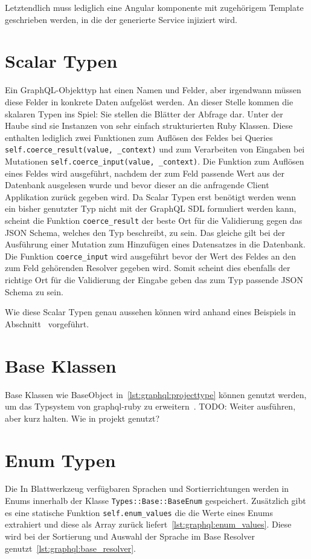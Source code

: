 Letztendlich muss lediglich eine Angular komponente mit zugehörigem Template geschrieben werden, in die der generierte Service injiziert wird.

\section{Scalar Typen}
\label{graphql:scalartypes}
Ein GraphQL-Objekttyp hat einen Namen und Felder, aber irgendwann müssen diese Felder in konkrete Daten aufgelöst werden. An dieser Stelle kommen die skalaren Typen ins Spiel: Sie stellen die Blätter der Abfrage dar. 
Unter der Haube sind sie Instanzen von sehr einfach strukturierten Ruby Klassen. Diese enthalten lediglich zwei Funktionen zum Auflösen des Feldes bei Queries \lstinline|self.coerce_result(value, _context)| und zum Verarbeiten von Eingaben bei Mutationen \lstinline|self.coerce_input(value, _context)|. Die Funktion zum Auflösen eines Feldes wird ausgeführt, nachdem der zum Feld passende Wert aus der Datenbank ausgelesen wurde und bevor dieser an die anfragende Client Applikation zurück gegeben wird. Da Scalar Typen erst benötigt werden wenn ein bisher genutzter Typ nicht mit der GraphQL SDL formuliert werden kann, scheint die Funktion \lstinline|coerce_result| der beste Ort für die Validierung gegen das JSON Schema, welches den Typ beschreibt, zu sein. Das gleiche gilt bei der Ausführung einer Mutation zum Hinzufügen eines Datensatzes in die Datenbank. Die Funktion \lstinline|coerce_input| wird ausgeführt bevor der Wert des Feldes an den zum Feld gehörenden Resolver gegeben wird. Somit scheint dies ebenfalls der richtige Ort für die Validierung der Eingabe geben das zum Typ passende JSON Schema zu sein.

Wie diese Scalar Typen genau aussehen können wird anhand eines Beispiels in Abschnitt~ vorgeführt.

\section{Base Klassen}
\label{graphql:baseclass}
Base Klassen wie BaseObject in~\ref{lst:graphql:projecttype} können genutzt werden, um das Typsystem von graphql-ruby zu erweitern~\cite{graphql-extending}. 
TODO: Weiter ausführen, aber kurz halten. Wie in projekt genutzt?

\section{Enum Typen}
\label{graphql:enumtypes}
Die In Blattwerkzeug verfügbaren Sprachen und Sortierrichtungen werden in Enums innerhalb der Klasse \lstinline|Types::Base::BaseEnum| gespeichert. Zusätzlich gibt es eine statische Funktion \lstinline|self.enum_values| die die Werte eines Enums extrahiert und diese als Array zurück liefert~\ref{lst:graphql:enum_values}. Diese wird bei der Sortierung und Auswahl der Sprache im Base Resolver genutzt~\ref{lst:graphql:base_resolver}.

